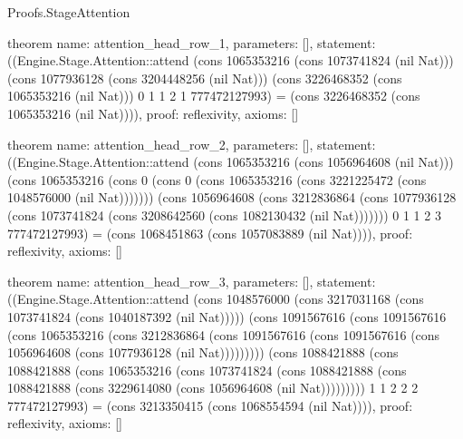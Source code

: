 \begin{lexlean}{Proofs.StageAttention}
\begin{semanticmodule}
theorem{
  name: attention_head_row_1,
  parameters: [],
  statement: ((Engine.Stage.Attention::attend (cons 1065353216 (cons 1073741824 (nil Nat))) (cons 1077936128 (cons 3204448256 (nil Nat))) (cons 3226468352 (cons 1065353216 (nil Nat))) 0 1 1 2 1 777472127993) = (cons 3226468352 (cons 1065353216 (nil Nat)))),
  proof: reflexivity{},
  axioms: []
}

theorem{
  name: attention_head_row_2,
  parameters: [],
  statement: ((Engine.Stage.Attention::attend (cons 1065353216 (cons 1056964608 (nil Nat))) (cons 1065353216 (cons 0 (cons 0 (cons 1065353216 (cons 3221225472 (cons 1048576000 (nil Nat))))))) (cons 1056964608 (cons 3212836864 (cons 1077936128 (cons 1073741824 (cons 3208642560 (cons 1082130432 (nil Nat))))))) 0 1 1 2 3 777472127993) = (cons 1068451863 (cons 1057083889 (nil Nat)))),
  proof: reflexivity{},
  axioms: []
}

theorem{
  name: attention_head_row_3,
  parameters: [],
  statement: ((Engine.Stage.Attention::attend (cons 1048576000 (cons 3217031168 (cons 1073741824 (cons 1040187392 (nil Nat))))) (cons 1091567616 (cons 1091567616 (cons 1065353216 (cons 3212836864 (cons 1091567616 (cons 1091567616 (cons 1056964608 (cons 1077936128 (nil Nat))))))))) (cons 1088421888 (cons 1088421888 (cons 1065353216 (cons 1073741824 (cons 1088421888 (cons 1088421888 (cons 3229614080 (cons 1056964608 (nil Nat))))))))) 1 1 2 2 2 777472127993) = (cons 3213350415 (cons 1068554594 (nil Nat)))),
  proof: reflexivity{},
  axioms: []
}
\end{semanticmodule}
\end{lexlean}
